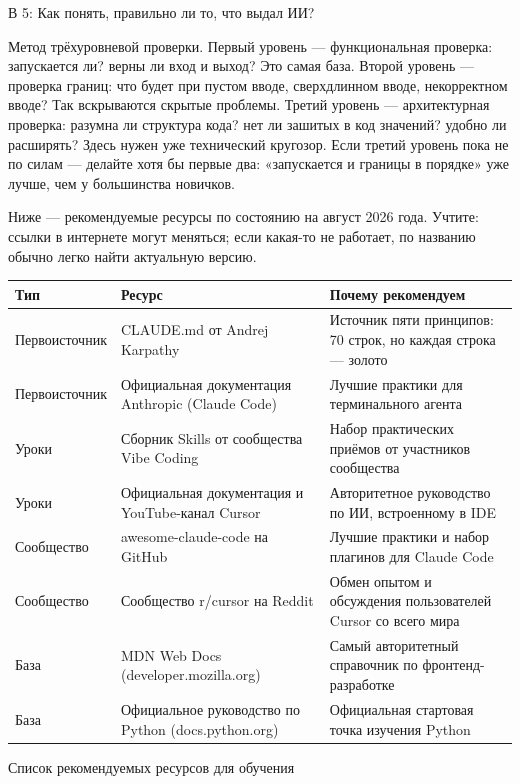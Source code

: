 В 5: Как понять, правильно ли то, что выдал ИИ?

Метод трёхуровневой проверки. Первый уровень — функциональная проверка: запускается ли? верны ли вход и выход? Это самая база. Второй уровень — проверка границ: что будет при пустом вводе, сверхдлинном вводе, некорректном вводе? Так вскрываются скрытые проблемы. Третий уровень — архитектурная проверка: разумна ли структура кода? нет ли зашитых в код значений? удобно ли расширять? Здесь нужен уже технический кругозор. Если третий уровень пока не по силам — делайте хотя бы первые два: «запускается и границы в порядке» уже лучше, чем у большинства новичков.


Ниже — рекомендуемые ресурсы по состоянию на август 2026 года. Учтите: ссылки в интернете могут меняться; если какая-то не работает, по названию обычно легко найти актуальную версию.

\begin{center}
\begin{tabularx}{\linewidth}{|X|X|X|}
\hline
\textbf{Тип} & \textbf{Ресурс} & \textbf{Почему рекомендуем} \tabularnewline
\hline
Первоисточник & CLAUDE.md от Andrej Karpathy & Источник пяти принципов: 70 строк, но каждая строка — золото \tabularnewline
Первоисточник & Официальная документация Anthropic (Claude Code) & Лучшие практики для терминального агента \tabularnewline
Уроки & Сборник Skills от сообщества Vibe Coding & Набор практических приёмов от участников сообщества \tabularnewline
Уроки & Официальная документация и YouTube-канал Cursor & Авторитетное руководство по ИИ, встроенному в IDE \tabularnewline
Сообщество & awesome-claude-code на GitHub & Лучшие практики и набор плагинов для Claude Code \tabularnewline
Сообщество & Сообщество r/cursor на Reddit & Обмен опытом и обсуждения пользователей Cursor со всего мира \tabularnewline
База & MDN Web Docs (developer.mozilla.org) & Самый авторитетный справочник по фронтенд-разработке \tabularnewline
База & Официальное руководство по Python (docs.python.org) & Официальная стартовая точка изучения Python \tabularnewline
\hline
\end{tabularx}
\end{center}

\begin{center}\small\color{gray}Список рекомендуемых ресурсов для обучения\end{center}


